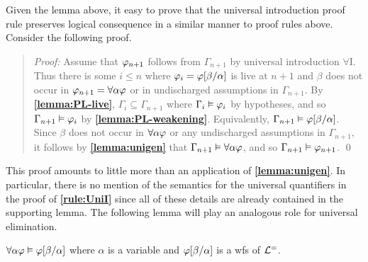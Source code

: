 Given the lemma above, it easy to prove that the universal introduction proof rule preserves logical consequence in a similar manner to proof rules above.
Consider the following proof.





\begin{quote} 
  \textit{Proof:} Assume that $\varphi_{n+1}$ follows from $\Gamma_{n+1}$ by universal introduction $\forall$I.
  Thus there is some $i\leq n$ where $\varphi_i=\varphi[\beta/\alpha]$ is live at $n+1$ and $\beta$ does not occur in $\varphi_{n+1}=\forall \alpha\varphi$ or in undischarged assumptions in $\Gamma_{n+1}$.
  By \textbf{\ref{lemma:PL-live}}, $\Gamma_i\subseteq \Gamma_{n+1}$ where $\Gamma_i\vDash\varphi_i$ by hypotheses, and so $\Gamma_{n+1} \vDash \varphi_i$ by \textbf{\ref{lemma:PL-weakening}}.
  Equivalently, $\Gamma_{n+1} \vDash \varphi[\beta/\alpha]$.
  Since $\beta$ does not occur in $\forall \alpha\varphi$ or any undischarged assumptions in $\Gamma_{n+1}$, it follows by \textbf{\ref{lemma:unigen}} that $\Gamma_{n+1}\vDash \forall \alpha\varphi$, and so $\Gamma_{n+1}\vDash\varphi_{n+1}$.
  \qed
\end{quote}

This proof amounts to little more than an application of \textbf{\ref{lemma:unigen}}.
In particular, there is no mention of the semantics for the universal quantifiers in the proof of \textbf{\ref{rule:UniI}} since all of these details are already contained in the supporting lemma.
The following lemma will play an analogous role for universal elimination.



\begin{Lthm} \label{lemma:uniinst}
  $\forall\alpha\varphi \vDash \varphi[\beta/\alpha]$ where $\alpha$ is a variable and $\varphi[\beta/\alpha]$ is a wfs of $\mathcal{L}^{=}$. 
\end{Lthm}

